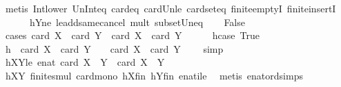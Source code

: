\begin{isabellebody}
\ {\isacharparenleft}{\kern0pt}metis\ Int{\isacharunderscore}{\kern0pt}lower{}\ Un{\isacharunderscore}{\kern0pt}Int{\isacharunderscore}{\kern0pt}eq{\isacharparenleft}{\kern0pt}{}{\isacharparenright}{\kern0pt}\ card{\isacharunderscore}{\kern0pt}{}{\isacharunderscore}{\kern0pt}eq\ card{\isacharunderscore}{\kern0pt}Un{\isacharunderscore}{\kern0pt}le\ card{\isacharunderscore}{\kern0pt}seteq\ finite{\isachardot}{\kern0pt}emptyI\ finite{\isachardot}{\kern0pt}insertI\ \ \isanewline
\ \ \ \ \ \ hY{}ne\ le{\isacharunderscore}{\kern0pt}add{\isacharunderscore}{\kern0pt}same{\isacharunderscore}{\kern0pt}cancel{}\ mult{\isacharunderscore}{\kern0pt}{}\ subset{\isacharunderscore}{\kern0pt}Un{\isacharunderscore}{\kern0pt}eq{\isacharparenright}{\kern0pt}\isanewline
\ \ \isamarkupfalse%
\ False\isanewline
\ \ \isamarkupfalse%
\ {\isacharparenleft}{\kern0pt}cases\ {\isachardoublequoteopen}card\ {\isacharquery}{\kern0pt}X{}\ {\isacharplus}{\kern0pt}\ card\ {\isacharquery}{\kern0pt}Y{}\ {\isachargreater}{\kern0pt}\ card\ X\ {\isacharplus}{\kern0pt}\ card\ Y{\isachardoublequoteclose}{\isacharparenright}{\kern0pt}\isanewline
\ \ \ \ \isamarkupfalse%
\ hcase{\isacharcolon}{\kern0pt}\ True\isanewline
\ \ \ \ \isamarkupfalse%
\ \isamarkupfalse%
\ h\ {\isacharcolon}{\kern0pt}\ {\isachardoublequoteopen}card\ X\ {\isacharplus}{\kern0pt}\ card\ Y\ {\isacharminus}{\kern0pt}\ {}\ {\isasymle}\ card\ {\isacharquery}{\kern0pt}X{}\ {\isacharplus}{\kern0pt}\ card\ {\isacharquery}{\kern0pt}Y{}\ {\isacharminus}{\kern0pt}\ {}{\isachardoublequoteclose}\ \isamarkupfalse%
\ simp\isanewline
\ \ \ \ \isamarkupfalse%
\ hXY{}le{\isacharcolon}{\kern0pt}\ {\isachardoublequoteopen}enat\ {\isacharparenleft}{\kern0pt}card\ {\isacharparenleft}{\kern0pt}{\isacharquery}{\kern0pt}X{}\ {\isasymcdots}\ {\isacharquery}{\kern0pt}Y{}{\isacharparenright}{\kern0pt}{\isacharparenright}{\kern0pt}\ {\isasymle}\ card\ {\isacharparenleft}{\kern0pt}X\ {\isasymcdots}\ Y{\isacharparenright}{\kern0pt}{\isachardoublequoteclose}\ \isanewline
\ \ \ \ \ \ \isamarkupfalse%
\ hXY{}\ finite{\isacharunderscore}{\kern0pt}smul\ card{\isacharunderscore}{\kern0pt}mono\ hXfin\ hYfin\ enat{\isacharunderscore}{\kern0pt}ile\ \isamarkupfalse%
\ {\isacharparenleft}{\kern0pt}metis\ enat{\isacharunderscore}{\kern0pt}ord{\isacharunderscore}{\kern0pt}simps{\isacharparenleft}{\kern0pt}{}{\isacharparenright}{\kern0pt}{\isacharparenright}{\kern0pt}\isanewline

\end{isabellebody}
